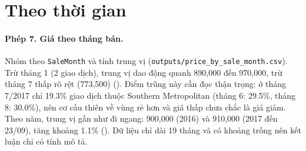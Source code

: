 \section{Theo thời gian}\label{sec:xuhuong}\label{sec:p7}
\paragraph{Phép 7. Giá theo tháng bán.} Nhóm theo \texttt{SaleMonth} và tính trung vị (\texttt{outputs/price\_by\_sale\_month.csv}). Trừ tháng 1 (2 giao dịch), trung vị dao động quanh 890,000 đến 970,000, trừ tháng 7 thấp rõ rệt (773,500) (). Điểm trũng này cần đọc thận trọng: ở tháng 7/2017 chỉ 19.3\% giao dịch thuộc Southern Metropolitan (tháng 6: 29.5\%, tháng 8: 30.0\%), nên cơ cấu thiên về vùng rẻ hơn và giá thấp chưa chắc là giá giảm. Theo năm, trung vị gần như đi ngang: 900,000 (2016) và 910,000 (2017 đến 23/09), tăng khoảng 1.1\% (). Dữ liệu chỉ dài 19 tháng và có khoảng trống nên kết luận chỉ có tính mô tả.
